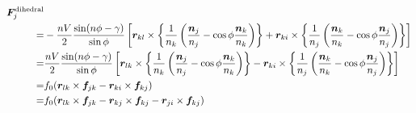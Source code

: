 \begin{align}
   \bm{F}_{j}^{\mathrm{dihedral}} &
   \notag
   \\
   =&
     -\frac{nV}{2} \frac{\sin(n\phi - \gamma)}{\sin{\phi}}
      \left[
              \bm{r}_{kl} \times
              \left\{
              \frac{1}{n_{k}}
              \left(
                     \frac{\bm{n}_{j}}{n_{j}} - \cos\phi \frac{\bm{n}_{k}}{n_{k}}
              \right)
              \right\}
            +
              \bm{r}_{ki} \times
              \left\{
              \frac{1}{n_{j}}
              \left(
                     \frac{\bm{n}_{k}}{n_{k}} - \cos\phi \frac{\bm{n}_{j}}{n_{j}}
              \right)
              \right\}
      \right]
   \notag
   \\
   =&
      \frac{nV}{2} \frac{\sin(n\phi - \gamma)}{\sin{\phi}}
      \left[
              \bm{r}_{lk} \times
              \left\{
              \frac{1}{n_{k}}
              \left(
                     \frac{\bm{n}_{j}}{n_{j}} - \cos\phi \frac{\bm{n}_{k}}{n_{k}}
              \right)
              \right\}
            -
              \bm{r}_{ki} \times
              \left\{
              \frac{1}{n_{j}}
              \left(
                     \frac{\bm{n}_{k}}{n_{k}} - \cos\phi \frac{\bm{n}_{j}}{n_{j}}
              \right)
              \right\}
      \right]
   \notag
   \\
   =&
     f_{0} (\bm{r}_{lk} \times \bm{f}_{jk} - \bm{r}_{ki} \times \bm{f}_{kj})
   \notag
   \\
   =&
     f_{0} (  \bm{r}_{lk} \times \bm{f}_{jk}
            - \bm{r}_{kj} \times \bm{f}_{kj}
            - \bm{r}_{ji} \times \bm{f}_{kj} )
   \notag
\end{align}

